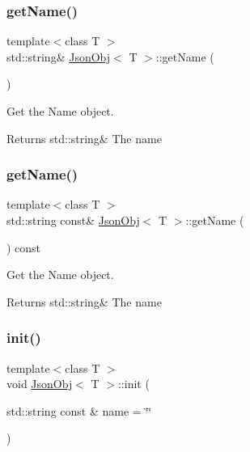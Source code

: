 \subsubsection{\texorpdfstring{get\+Name()}{getName()}\hspace{0.1cm}{\footnotesize\ttfamily [1/2]}}
{\footnotesize\ttfamily template$<$class T $>$ \\
std\+::string\& \hyperlink{class_json_obj}{Json\+Obj}$<$ T $>$\+::get\+Name (\begin{DoxyParamCaption}{ }\end{DoxyParamCaption})\hspace{0.3cm}{\ttfamily [inline]}}



Get the Name object. 

\begin{DoxyReturn}{Returns}
std\+::string\& The name 
\end{DoxyReturn}
\mbox{\label{class_json_obj_afb9de633557bc0289d65e8aac2e98936}} 
\subsubsection{\texorpdfstring{get\+Name()}{getName()}\hspace{0.1cm}{\footnotesize\ttfamily [2/2]}}
{\footnotesize\ttfamily template$<$class T $>$ \\
std\+::string const\& \hyperlink{class_json_obj}{Json\+Obj}$<$ T $>$\+::get\+Name (\begin{DoxyParamCaption}{ }\end{DoxyParamCaption}) const\hspace{0.3cm}{\ttfamily [inline]}}



Get the Name object. 

\begin{DoxyReturn}{Returns}
std\+::string\& The name 
\end{DoxyReturn}
\mbox{\label{class_json_obj_ab79b8466cedd54ed6a4e9fc68d309f16}} 
\subsubsection{\texorpdfstring{init()}{init()}}
{\footnotesize\ttfamily template$<$class T $>$ \\
void \hyperlink{class_json_obj}{Json\+Obj}$<$ T $>$\+::init (\begin{DoxyParamCaption}\item[{std\+::string const \&}]{name = {\ttfamily \char`\"{}\char`\"{}} }\end{DoxyParamCaption})\hspace{0.3cm}{\ttfamily [inline]}}




